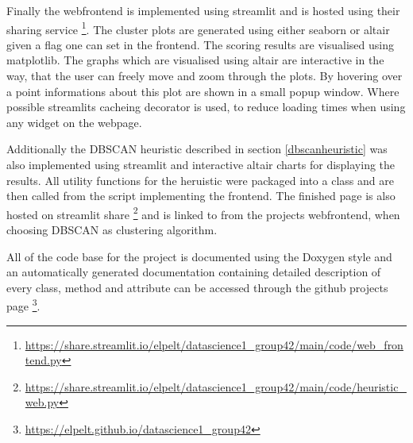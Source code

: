 Finally the webfrontend is implemented using streamlit and is hosted using their sharing service \footnote{\scriptsize\url{https://share.streamlit.io/elpelt/datascience1_group42/main/code/web_frontend.py}}. The cluster plots are generated using either seaborn or altair given a flag one can set in the frontend. The scoring results are visualised using matplotlib. The graphs which are visualised using altair are interactive in the way, that the user can freely move and zoom through the plots. By hovering over a point informations about this plot are shown in a small popup window. Where possible streamlits cacheing decorator is used, to reduce loading times when using any widget on the webpage.

Additionally the DBSCAN heuristic described in section \ref{dbscanheuristic} was also implemented using streamlit and interactive altair charts for displaying the results. All utility functions for the heruistic were packaged into a class and are then called from the script implementing the frontend. The finished page is also hosted on streamlit share \footnote{\scriptsize\url{https://share.streamlit.io/elpelt/datascience1_group42/main/code/heuristic_web.py}} and is linked to from the projects webfrontend, when choosing DBSCAN as clustering algorithm.

All of the code base for the project is documented using the Doxygen style and an automatically generated documentation containing detailed description of every class, method and attribute can be accessed through the github projects page \footnote{\scriptsize\url{https://elpelt.github.io/datascience1_group42}}.